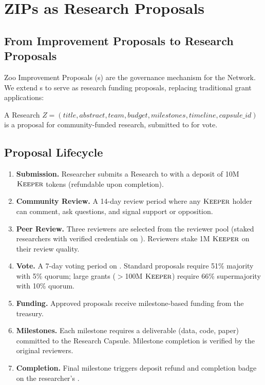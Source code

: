 \section{ZIPs as Research Proposals}

\label{sec:zips}

\subsection{From Improvement Proposals to Research Proposals}

Zoo Improvement Proposals (\ZIP{}s) \cite{zoo-dao-governance} are the governance mechanism for the \Zoo{} Network. We extend \ZIP{}s to serve as research funding proposals, replacing traditional grant applications:

\begin{definition}
A Research \ZIP{} $Z = (\textit{title}, \textit{abstract}, \textit{team}, \textit{budget}, \textit{milestones}, \textit{timeline}, \textit{capsule\_id})$ is a proposal for community-funded research, submitted to \GChain{} for \DAO{} vote.
\end{definition}

\subsection{Proposal Lifecycle}

\begin{enumerate}
    \item \textbf{Submission.} Researcher submits a Research \ZIP{} to \GChain{} with a deposit of 10M $\textsc{Keeper}$ tokens (refundable upon completion).
    \item \textbf{Community Review.} A 14-day review period where any $\textsc{Keeper}$ holder can comment, ask questions, and signal support or opposition.
    \item \textbf{Peer Review.} Three reviewers are selected from the reviewer pool (staked researchers with verified credentials on \IChain{}). Reviewers stake 1M $\textsc{Keeper}$ on their review quality.
    \item \textbf{Vote.} A 7-day voting period on \GChain{}. Standard proposals require 51\% majority with 5\% quorum; large grants ($>$100M $\textsc{Keeper}$) require 66\% supermajority with 10\% quorum.
    \item \textbf{Funding.} Approved proposals receive milestone-based funding from the \DAO{} treasury.
    \item \textbf{Milestones.} Each milestone requires a deliverable (data, code, paper) committed to the Research Capsule. Milestone completion is verified by the original reviewers.
    \item \textbf{Completion.} Final milestone triggers deposit refund and completion badge on the researcher's \IChain{} \DID{}.
\end{enumerate}

